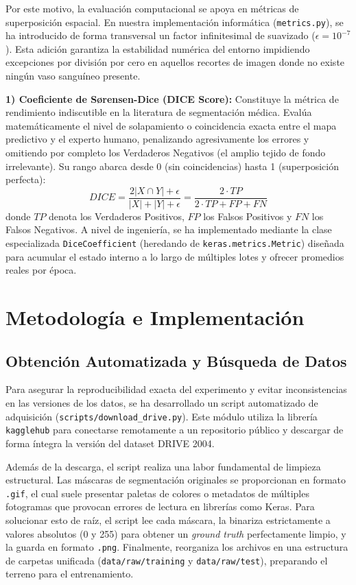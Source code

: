 \documentclass[conference]{IEEEtran}
\begin{document}
Por este motivo, la evaluación computacional se apoya en métricas de superposición espacial. En nuestra implementación informática (\texttt{metrics.py}), se ha introducido de forma transversal un factor infinitesimal de suavizado ($\epsilon = 10^{-7}$). Esta adición garantiza la estabilidad numérica del entorno impidiendo excepciones por división por cero en aquellos recortes de imagen donde no existe ningún vaso sanguíneo presente.

\textbf{1) Coeficiente de Sørensen-Dice (DICE Score):} Constituye la métrica de rendimiento indiscutible en la literatura de segmentación médica. Evalúa matemáticamente el nivel de solapamiento o coincidencia exacta entre el mapa predictivo y el experto humano, penalizando agresivamente los errores y omitiendo por completo los Verdaderos Negativos (el amplio tejido de fondo irrelevante). Su rango abarca desde 0 (sin coincidencias) hasta 1 (superposición perfecta):
\begin{equation}
DICE = \frac{2 |X \cap Y| + \epsilon}{|X| + |Y| + \epsilon} = \frac{2 \cdot TP}{2 \cdot TP + FP + FN}
\end{equation}
donde $TP$ denota los Verdaderos Positivos, $FP$ los Falsos Positivos y $FN$ los Falsos Negativos. A nivel de ingeniería, se ha implementado mediante la clase especializada \texttt{DiceCoefficient} (heredando de \texttt{keras.metrics.Metric}) diseñada para acumular el estado interno a lo largo de múltiples lotes y ofrecer promedios reales por época.

\section{Metodología e Implementación}

\subsection{Obtención Automatizada y Búsqueda de Datos}
Para asegurar la reproducibilidad exacta del experimento y evitar inconsistencias en las versiones de los datos, se ha desarrollado un script automatizado de adquisición (\texttt{scripts/download\_drive.py}). Este módulo utiliza la librería \texttt{kagglehub} para conectarse remotamente a un repositorio público y descargar de forma íntegra la versión del dataset DRIVE 2004.

Además de la descarga, el script realiza una labor fundamental de limpieza estructural. Las máscaras de segmentación originales se proporcionan en formato \texttt{.gif}, el cual suele presentar paletas de colores o metadatos de múltiples fotogramas que provocan errores de lectura en librerías como Keras. Para solucionar esto de raíz, el script lee cada máscara, la binariza estrictamente a valores absolutos (0 y 255) para obtener un \textit{ground truth} perfectamente limpio, y la guarda en formato \texttt{.png}. Finalmente, reorganiza los archivos en una estructura de carpetas unificada (\texttt{data/raw/training} y \texttt{data/raw/test}), preparando el terreno para el entrenamiento.
\end{document}
